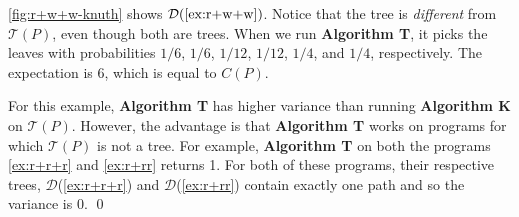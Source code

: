 \begin{tcolorbox}[
    colback=SkyBlue!5,
    colframe=blue!20,
    boxrule=1pt,
    arc=2pt,
    width=\textwidth,
    breakable
]

\begin{example}
\cref{fig:r+w+w-knuth} shows $\mathcal{D}(\ref{ex:r+w+w})$. 
Notice that the tree is \emph{different} from $\mathcal{T}(P)$,
even though both are trees.
When we run \textbf{Algorithm T}, it picks the leaves 
with probabilities $1/6$, $1/6$, $1/12$, $1/12$, $1/4$, and $1/4$,
respectively.
The expectation is 6, which is equal to $C(P)$.

For this example, \textbf{Algorithm T} has higher variance than running 
\textbf{Algorithm K} on $\mathcal{T}(P)$.
However, the advantage is that \textbf{Algorithm T} works on programs for which
$\mathcal{T}(P)$ is not a tree.
For example, \textbf{Algorithm T} on both the programs \ref{ex:r+r+r} and \ref{ex:r+rr} returns 1. For both of these programs, their respective trees, $\mathcal{D}$(\ref{ex:r+r+r}) and $\mathcal{D}$(\ref{ex:r+rr}) contain exactly one
path and so the variance is 0. 
\qed
\end{example}

\end{tcolorbox}